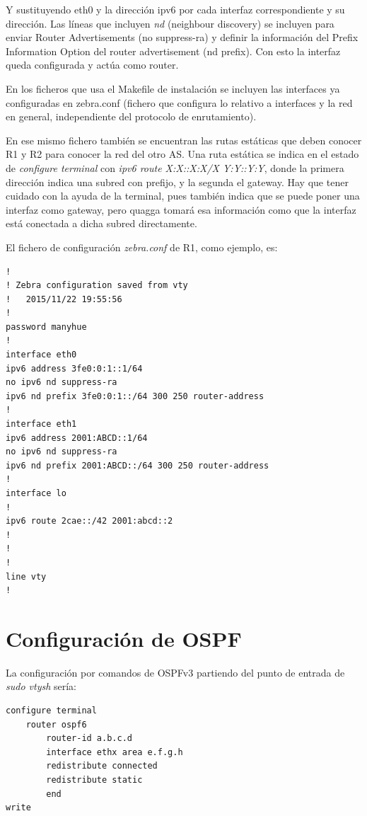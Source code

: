 \documentclass{article}
\begin{document}
Y sustituyendo eth0 y la dirección ipv6 por cada interfaz correspondiente y su dirección. Las líneas que incluyen \textit{nd} (neighbour discovery) se incluyen para enviar Router Advertisements (no suppress-ra) y definir la información del Prefix Information Option del router advertisement (nd prefix). Con esto la interfaz queda configurada y actúa como router.


En los ficheros que usa el Makefile de instalación se incluyen las interfaces ya configuradas en zebra.conf (fichero que configura lo relativo a interfaces y la red en general, independiente del protocolo de enrutamiento).

En ese mismo fichero también se encuentran las rutas estáticas que deben conocer R1 y R2 para conocer la red del otro AS. Una ruta estática se indica en el estado de \textit{configure terminal} con \textit{ipv6 route X:X::X:X/X  Y:Y::Y:Y}, donde la primera dirección indica una subred con prefijo, y la segunda el gateway. Hay que tener cuidado con la ayuda de la terminal, pues también indica que se puede poner una interfaz como gateway, pero quagga tomará esa información como que la interfaz está conectada a dicha subred directamente.

\hfil

El fichero de configuración \textit{zebra.conf} de R1, como ejemplo, es:

\begin{lstlisting}
!
! Zebra configuration saved from vty
!   2015/11/22 19:55:56
!
password manyhue
!
interface eth0
ipv6 address 3fe0:0:1::1/64
no ipv6 nd suppress-ra
ipv6 nd prefix 3fe0:0:1::/64 300 250 router-address
!
interface eth1
ipv6 address 2001:ABCD::1/64
no ipv6 nd suppress-ra
ipv6 nd prefix 2001:ABCD::/64 300 250 router-address
!
interface lo
!
ipv6 route 2cae::/42 2001:abcd::2
!
!
!
line vty
!
\end{lstlisting}


\section{Configuración de OSPF}

La configuración por comandos de OSPFv3 partiendo del punto de entrada de \textit{sudo vtysh} sería:

\hfil

\begin{BVerbatim}
configure terminal
	router ospf6
		router-id a.b.c.d
		interface ethx area e.f.g.h
		redistribute connected
		redistribute static
		end
write
\end{BVerbatim}
\end{document}
